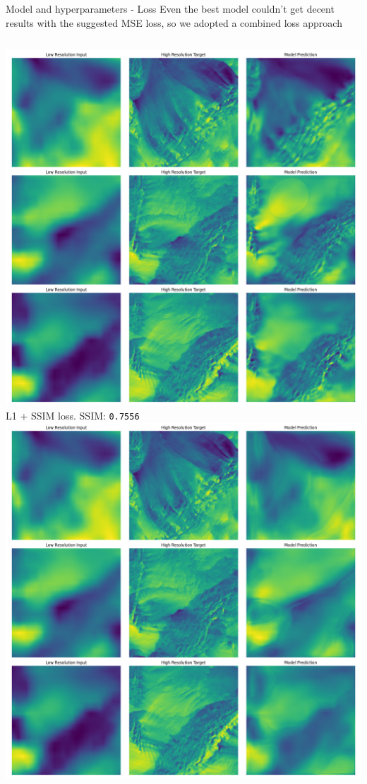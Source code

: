 \documentclass[8pt]{beamer}
\begin{document}
\begin{frame}{Model and hyperparameters - Loss}
    Even the best model couldn't get decent results with the suggested MSE loss, so we adopted a combined loss approach
    \begin{columns}
            \includegraphics[width=\linewidth]{images/unet_vectors_l1ssim_loss_200_epochs_4_batch_1em3_lr_1em5_weightdecay.png}
            \newline
            \centering \small L1 + SSIM loss. SSIM: \texttt{0.7556}
            \includegraphics[width=\linewidth]{images/unet_vectors_mse_loss_200_epochs_4_batch_1em3_lr_1em5_weightdecay.png}

\end{columns}
\end{frame}
\end{document}
